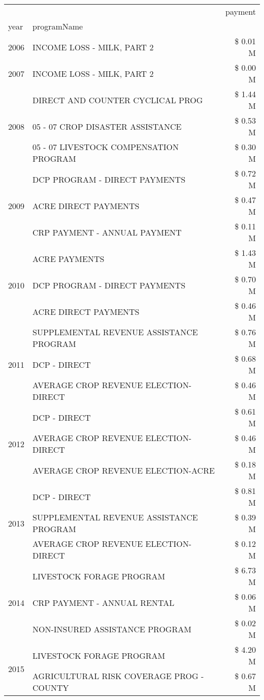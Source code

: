 \begin{tabular}{llr}
\toprule
 &  & payment \\
year & programName &  \\
\midrule
2006 & INCOME LOSS - MILK, PART 2 & \$ 0.01 M \\
\cline{1-3}
2007 & INCOME LOSS - MILK, PART 2 & \$ 0.00 M \\
\cline{1-3}
\multirow[t]{3}{*}{2008} & DIRECT AND COUNTER CYCLICAL PROG & \$ 1.44 M \\
 & 05 - 07 CROP DISASTER ASSISTANCE & \$ 0.53 M \\
 & 05 - 07 LIVESTOCK COMPENSATION PROGRAM & \$ 0.30 M \\
\cline{1-3}
\multirow[t]{3}{*}{2009} & DCP PROGRAM - DIRECT PAYMENTS & \$ 0.72 M \\
 & ACRE DIRECT PAYMENTS & \$ 0.47 M \\
 & CRP PAYMENT - ANNUAL PAYMENT & \$ 0.11 M \\
\cline{1-3}
\multirow[t]{3}{*}{2010} & ACRE PAYMENTS & \$ 1.43 M \\
 & DCP PROGRAM - DIRECT PAYMENTS & \$ 0.70 M \\
 & ACRE DIRECT PAYMENTS & \$ 0.46 M \\
\cline{1-3}
\multirow[t]{3}{*}{2011} & SUPPLEMENTAL REVENUE ASSISTANCE PROGRAM & \$ 0.76 M \\
 & DCP - DIRECT & \$ 0.68 M \\
 & AVERAGE CROP REVENUE ELECTION-DIRECT & \$ 0.46 M \\
\cline{1-3}
\multirow[t]{3}{*}{2012} & DCP - DIRECT & \$ 0.61 M \\
 & AVERAGE CROP REVENUE ELECTION-DIRECT & \$ 0.46 M \\
 & AVERAGE CROP REVENUE ELECTION-ACRE & \$ 0.18 M \\
\cline{1-3}
\multirow[t]{3}{*}{2013} & DCP - DIRECT & \$ 0.81 M \\
 & SUPPLEMENTAL REVENUE ASSISTANCE PROGRAM & \$ 0.39 M \\
 & AVERAGE CROP REVENUE ELECTION-DIRECT & \$ 0.12 M \\
\cline{1-3}
\multirow[t]{3}{*}{2014} & LIVESTOCK FORAGE PROGRAM & \$ 6.73 M \\
 & CRP PAYMENT - ANNUAL RENTAL & \$ 0.06 M \\
 & NON-INSURED ASSISTANCE PROGRAM & \$ 0.02 M \\
\cline{1-3}
\multirow[t]{3}{*}{2015} & LIVESTOCK FORAGE PROGRAM & \$ 4.20 M \\
 & AGRICULTURAL RISK COVERAGE PROG - COUNTY & \$ 0.67 M \\

\end{tabular}
